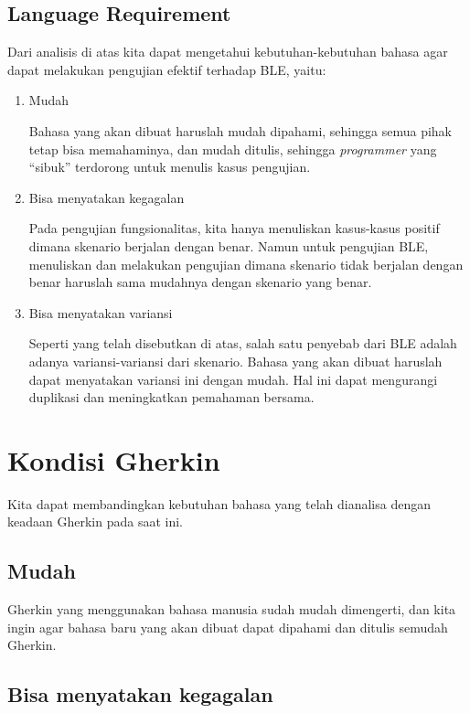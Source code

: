 \subsection{Language Requirement}

Dari analisis di atas kita dapat mengetahui kebutuhan-kebutuhan bahasa
agar dapat melakukan pengujian efektif terhadap BLE, yaitu:

\begin{enumerate}
    \item Mudah
    
    Bahasa yang akan dibuat haruslah mudah dipahami, sehingga semua pihak tetap
    bisa memahaminya, dan mudah ditulis, sehingga \emph{programmer} yang ``sibuk''
    terdorong untuk menulis kasus pengujian.

    \item Bisa menyatakan kegagalan

    Pada pengujian fungsionalitas, kita hanya menuliskan kasus-kasus positif
    dimana skenario berjalan dengan benar. Namun untuk pengujian BLE,
    menuliskan dan melakukan pengujian dimana skenario tidak berjalan dengan benar
    haruslah sama mudahnya dengan skenario yang benar.

    \item Bisa menyatakan variansi
    
    Seperti yang telah disebutkan di atas, salah satu penyebab dari BLE adalah
    adanya variansi-variansi dari skenario.
    Bahasa yang akan dibuat haruslah dapat menyatakan variansi ini dengan mudah.
    Hal ini dapat mengurangi duplikasi dan meningkatkan pemahaman bersama.
\end{enumerate}



\section{Kondisi Gherkin}

Kita dapat membandingkan kebutuhan bahasa yang telah dianalisa dengan keadaan Gherkin pada saat ini.

\subsection*{Mudah}

Gherkin yang menggunakan bahasa manusia sudah mudah dimengerti, dan kita ingin agar bahasa
baru yang akan dibuat dapat dipahami dan ditulis semudah Gherkin.

\subsection*{Bisa menyatakan kegagalan}

